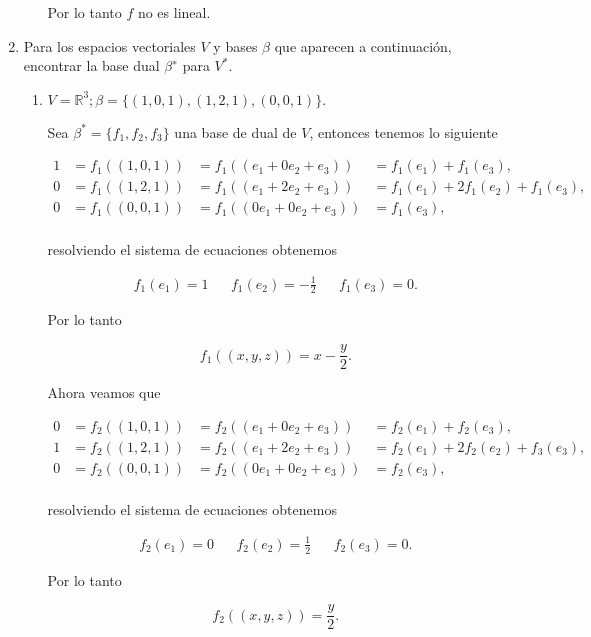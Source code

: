\documentclass[letterpaper]{article}
\theoremstyle{definition}
\theoremstyle{lemathm}
\theoremstyle{lemademthm}
\newcommand{\R}{\mathbb{R}}
\begin{document}
\begin{enumerate}
\begin{enumerate}
			Por lo tanto $f$ no es lineal.

		\end{enumerate}

		\item Para los espacios vectoriales $V$ y bases $\beta$ que aparecen a continuación, encontrar la base dual $β^∗$ para $V^*$.
		
		\begin{enumerate}
			\item $V=\R^3; \beta = \{(1,0,1),(1,2,1),(0,0,1)\}.$
			
			Sea $\beta^* = \{f_1,f_2,f_3\}$ una base de dual de $V$, entonces tenemos lo siguiente

			\begin{align*}
				1 &= f_1((1,0,1)) &= f_1((e_1 + 0e_2 + e_3)) &= f_1(e_1) + f_1(e_3),\\
				0 &= f_1((1,2,1)) &= f_1((e_1 + 2e_2 + e_3)) &= f_1(e_1) + 2f_1(e_2) + f_1(e_3),\\
				0 &= f_1((0,0,1)) &= f_1((0e_1 + 0e_2 + e_3)) &= f_1(e_3),\\
			\end{align*}

			resolviendo el sistema de ecuaciones obtenemos

			\begin{align*}
				f_1(e_1) = 1 && f_1(e_2) = -\frac{1}{2} && f_1(e_3) = 0.
			\end{align*}

			Por lo tanto

			\[f_1((x,y,z)) = x - \frac{y}{2}.\]

			Ahora veamos que

			\begin{align*}
				0 &= f_2((1,0,1)) &= f_2((e_1 + 0e_2 + e_3)) &= f_2(e_1) + f_2(e_3),\\
				1 &= f_2((1,2,1)) &= f_2((e_1 + 2e_2 + e_3)) &= f_2(e_1) + 2f_2(e_2) + f_3(e_3),\\
				0 &= f_2((0,0,1)) &= f_2((0e_1 + 0e_2 + e_3)) &= f_2(e_3),\\
			\end{align*}

			resolviendo el sistema de ecuaciones obtenemos

			\begin{align*}
				f_2(e_1) = 0 && f_2(e_2) = \frac{1}{2} && f_2(e_3) = 0.
			\end{align*}

			Por lo tanto

			\[f_2((x,y,z)) = \frac{y}{2}.\]


\end{enumerate}
\end{enumerate}
\end{document}
